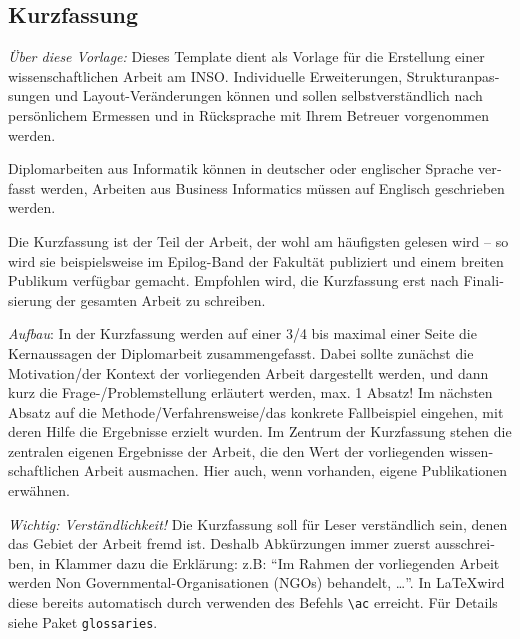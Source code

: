 
\cleardoublepage
{}




\begin{otherlanguage}{ngerman}

  \chapter*{Kurzfassung}

	\emph{Über diese Vorlage:}
	Dieses Template dient als Vorlage für die Erstellung einer wissenschaftlichen Arbeit am INSO. Individuelle Erweiterungen, Strukturanpassungen und Layout-Veränderungen können und sollen selbstverständlich nach persönlichem Ermessen und in Rücksprache mit Ihrem Betreuer vorgenommen werden.

	\makeatletter\ifthesis@masterthesis
	Diplomarbeiten aus Informatik können in deutscher oder englischer Sprache verfasst werden, Arbeiten aus Business Informatics müssen auf Englisch geschrieben werden.

	Die Kurzfassung ist der Teil der Arbeit, der wohl am häufigsten gelesen wird -- so wird sie beispielsweise im Epilog-Band der Fakultät publiziert und einem breiten Publikum verfügbar gemacht. Empfohlen wird, die Kurzfassung erst nach Finalisierung der gesamten Arbeit zu schreiben.
	\fi\makeatother

	\emph{Aufbau}:
	In der Kurzfassung werden auf einer 3/4 bis maximal einer Seite die Kernaussagen der Diplomarbeit zusammengefasst. Dabei sollte zunächst die Motivation/der Kontext der vorliegenden Arbeit dargestellt werden, und dann kurz die Frage-/Problemstellung erläutert werden, max. 1 Absatz! Im nächsten Absatz auf die Methode/Verfahrensweise/das konkrete Fallbeispiel eingehen, mit deren Hilfe die Ergebnisse erzielt wurden. Im Zentrum der Kurzfassung stehen die zentralen eigenen Ergebnisse der Arbeit, die den Wert der vorliegenden wissenschaftlichen Arbeit ausmachen. Hier auch, wenn vorhanden, eigene Publikationen erwähnen.

	\emph{Wichtig: Verständlichkeit!}
	Die Kurzfassung soll für Leser verständlich sein, denen das Gebiet der Arbeit fremd ist. Deshalb Abkürzungen immer zuerst ausschreiben, in Klammer dazu die Erklärung: z.B: \enquote{Im Rahmen der vorliegenden Arbeit werden Non Governmental-Organisationen (NGOs) behandelt, \ldots}. In \LaTeX wird diese bereits automatisch durch verwenden des Befehls \verb|\ac| erreicht. Für Details siehe Paket \texttt{glossaries}.


\end{otherlanguage}
